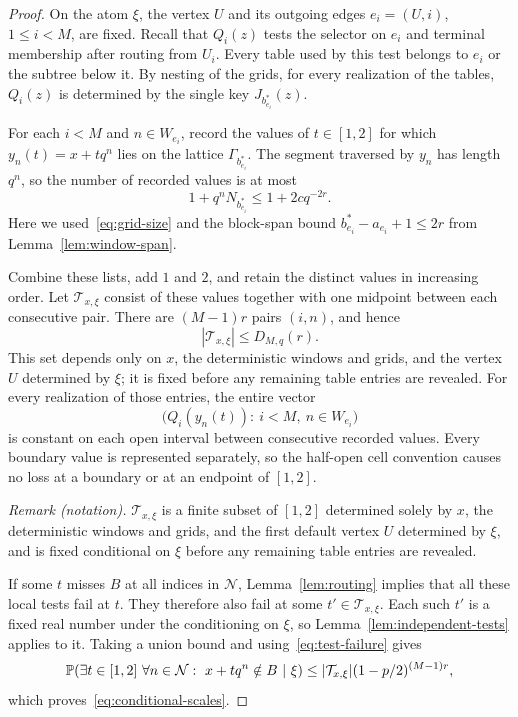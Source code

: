 \begin{proof}
On the atom $\xi$, the vertex $U$ and its outgoing edges
$e_i=(U,i)$, $1\le i<M$, are fixed.  Recall that
$Q_i(z)$ tests the selector on $e_i$ and terminal membership after
routing from $U_i$.  Every table used by this test belongs to $e_i$
or the subtree below it.  By nesting of the grids, for every realization
of the tables, $Q_i(z)$ is determined by the single key
$J_{b_{e_i}^*}(z)$.

For each $i<M$ and $n\in W_{e_i}$, record the values of $t\in[1,2]$
for which $y_n(t)=x+tq^n$ lies on the lattice
$\Gamma_{b_{e_i}^*}$.  The segment traversed by $y_n$ has length
$q^n$, so the number of recorded values is at most
\begin{equation}\label{eq:local-boundaries}
 1+q^nN_{b_{e_i}^*}
 \le 1+2c q^{-2r}.
\end{equation}
Here we used~\eqref{eq:grid-size} and the block-span bound
$b_{e_i}^*-a_{e_i}+1\le2r$ from
Lemma~\ref{lem:window-span}.

Combine these lists, add $1$ and $2$, and retain the distinct values in
increasing order.  Let $\mathcal T_{x,\xi}$ consist of these values
together with one midpoint between each consecutive pair.  There are
$(M-1)r$ pairs $(i,n)$, and hence
\[
 |\mathcal T_{x,\xi}|\le D_{M,q}(r).
\]
This set depends only on $x$, the deterministic windows and grids, and
the vertex $U$ determined by $\xi$; it is fixed before any remaining
table entries are revealed.  For every realization of those entries,
the entire vector
\[
 \bigl(Q_i(y_n(t)):\ i<M,\ n\in W_{e_i}\bigr)
\]
is constant on each open interval between consecutive recorded values.
Every boundary value is represented separately, so the half-open cell
convention causes no loss at a boundary or at an endpoint of $[1,2]$.

\noindent\textit{Remark (notation).} $\mathcal T_{x,\xi}$ is a finite subset of $[1,2]$ determined solely by $x$, the deterministic windows and grids, and the first default vertex $U$ determined by $\xi$, and is fixed conditional on $\xi$ before any remaining table entries are revealed.


If some $t$ misses $B$ at all indices in $\mathcal N$,
Lemma~\ref{lem:routing} implies that all these local tests fail at $t$.
They therefore also fail at some $t'\in\mathcal T_{x,\xi}$.
Each such $t'$ is a fixed real number under the conditioning on $\xi$,
so Lemma~\ref{lem:independent-tests} applies to it.  Taking a union
bound and using~\eqref{eq:test-failure} gives
\[
 \mathbb P\!\left(
  \exists t\in[1,2]\ \forall n\in\mathcal N:\
  x+tq^n\notin B\ \middle|\ \xi
 \right)
 \le |\mathcal T_{x,\xi}|(1-p/2)^{(M-1)r},
\]
which proves~\eqref{eq:conditional-scales}.
\end{proof}

